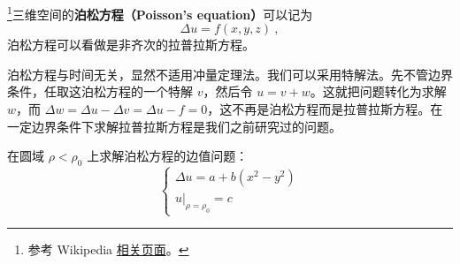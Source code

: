 

\footnote{参考 Wikipedia \href{https://en.wikipedia.org/wiki/Poisson's_equation}{相关页面}。}三维空间的\textbf{泊松方程（Poisson's equation）}可以记为
\begin{equation}
\Delta u=f(x, y, z)~,
\end{equation}
泊松方程可以看做是非齐次的拉普拉斯方程。

泊松方程与时间无关，显然不适用冲量定理法。我们可以采用特解法。先不管边界条件，任取这泊松方程的一个特解 $v$，然后令 $u=v+w$。这就把问题转化为求解 $w$，而 $\Delta w=\Delta u-\Delta v=\Delta u-f=0$，这不再是泊松方程而是拉普拉斯方程。在一定边界条件下求解拉普拉斯方程是我们之前研究过的问题。

\begin{example}{}
在圆域 $\rho<\rho_0$ 上求解泊松方程的边值问题：
\begin{equation}
\left\{\begin{array}{l}\Delta u=a+b\left(x^{2}-y^{2}\right) \\ \left.u\right|_{\rho=\rho_{0}}=c\end{array}\right.
\end{equation}


\end{example}
